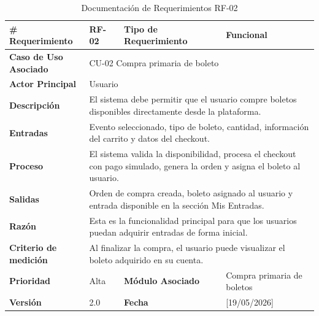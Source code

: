 \documentclass[12pt,letterpaper]{article}
\begin{document}

\begin{table}[H]
\centering
\scriptsize
\renewcommand{\arraystretch}{1.05}
\setlength{\tabcolsep}{3pt}

\newlength{\anchoceldaRFdos}
\setlength{\anchoceldaRFdos}{\dimexpr\textwidth-2.7cm-8\tabcolsep-5\arrayrulewidth\relax}

\begin{tabularx}{\textwidth}{|p{2.7cm}|X|p{2.8cm}|X|}
\hline
\textbf{\# Requerimiento} & RF-02 & \textbf{Tipo de Requerimiento} & Funcional \\ \hline

\textbf{Caso de Uso Asociado} & 
\multicolumn{3}{p{\anchoceldaRFdos}|}{CU-02 Compra primaria de boleto} \\ \hline

\textbf{Actor Principal} & 
\multicolumn{3}{p{\anchoceldaRFdos}|}{Usuario} \\ \hline

\textbf{Descripción} & 
\multicolumn{3}{p{\anchoceldaRFdos}|}{El sistema debe permitir que el usuario compre boletos disponibles directamente desde la plataforma.} \\ \hline

\textbf{Entradas} & 
\multicolumn{3}{p{\anchoceldaRFdos}|}{Evento seleccionado, tipo de boleto, cantidad, información del carrito y datos del checkout.} \\ \hline

\textbf{Proceso} & 
\multicolumn{3}{p{\anchoceldaRFdos}|}{El sistema valida la disponibilidad, procesa el checkout con pago simulado, genera la orden y asigna el boleto al usuario.} \\ \hline

\textbf{Salidas} & 
\multicolumn{3}{p{\anchoceldaRFdos}|}{Orden de compra creada, boleto asignado al usuario y entrada disponible en la sección Mis Entradas.} \\ \hline

\textbf{Razón} & 
\multicolumn{3}{p{\anchoceldaRFdos}|}{Esta es la funcionalidad principal para que los usuarios puedan adquirir entradas de forma inicial.} \\ \hline

\textbf{Criterio de medición} & 
\multicolumn{3}{p{\anchoceldaRFdos}|}{Al finalizar la compra, el usuario puede visualizar el boleto adquirido en su cuenta.} \\ \hline

\textbf{Prioridad} & Alta & \textbf{Módulo Asociado} & Compra primaria de boletos \\ \hline

\textbf{Versión} & 2.0 & \textbf{Fecha} & [19/05/2026] \\ \hline

\end{tabularx}

\caption{Documentación de Requerimientos RF-02}
\label{tab:documentacion_requerimientos_rf02}
\normalsize
\end{table}
\end{document}
